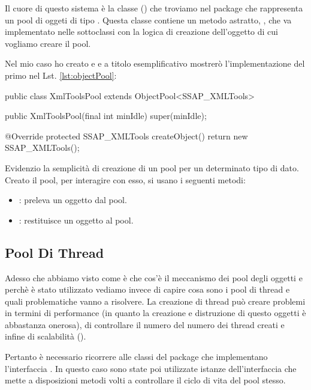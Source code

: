 Il cuore di questo sistema è la classe  (\cite{objectpool}) che troviamo nel package  che rappresenta un pool di oggeti di tipo . Questa classe contiene un metodo astratto, , che va implementato nelle sottoclassi con la logica di creazione dell'oggetto di cui vogliamo creare il pool.

Nel mio caso ho creato  e  e a titolo esemplificativo mostrerò l'implementazione del primo nel Lst. \ref{lst:objectPool}:

\begin{java}[caption={Implementazione di ObjectPool},label={lst:objectPool}]
public class XmlToolsPool extends ObjectPool<SSAP_XMLTools>{
	
	public XmlToolsPool(final int minIdle) {
		super(minIdle);
	}

	@Override
	protected SSAP_XMLTools createObject() {
		return new SSAP_XMLTools();
	}
}
\end{java}

\noindent
Evidenzio la semplicità di creazione di un pool per un determinato tipo di dato. Creato il pool, per interagire con esso, si usano i seguenti metodi:

\begin{itemize}
	\item {}: preleva un oggetto dal pool.
	\item {}: restituisce un oggetto al pool.
\end{itemize}

\subsection{Pool Di Thread}

Adesso che abbiamo visto come è che cos'è il meccanismo dei pool degli oggetti e perchè è stato utilizzato vediamo invece di capire cosa sono i pool di thread e quali problematiche vanno a risolvere.
La creazione di thread può creare problemi in termini di performance (in quanto la creazione e distruzione di questo oggetti è abbastanza onerosa), di controllare il numero del numero dei thread creati e infine di scalabilità (\cite{vetti2008}).

Pertanto è necessario ricorrere alle classi del package  che implementano l'interfaccia . In questo caso sono state poi utilizzate istanze dell'interfaccia  che mette a disposizioni metodi volti a controllare il ciclo di vita del pool stesso.


